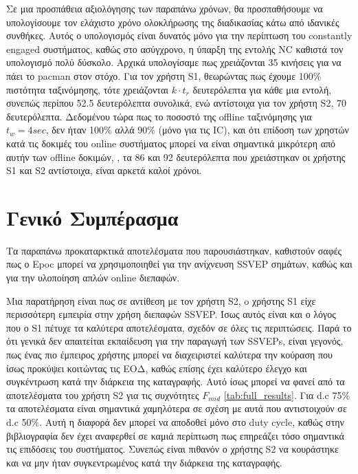 \documentclass[11pt,a4paper,english,greek,twoside]{../Thesis}
\begin{document}
\par Σε μια προσπάθεια αξιολόγησης των παραπάνω χρόνων, θα προσπαθήσουμε να υπολογίσουμε τον ελάχιστο χρόνο ολοκλήρωσης της διαδικασίας κάτω από ιδανικές συνθήκες. Αυτός ο υπολογισμός είναι δυνατός μόνο για την περίπτωση του constantly engaged συστήματος, καθώς στο ασύγχρονο, η ύπαρξη της εντολής NC καθιστά τον υπολογισμό πολύ δύσκολο. Αρχικά υπολογίσαμε πως χρειάζονται 35 κινήσεις για να πάει το pacman στον στόχο. Για τον χρήστη S1, θεωρώντας πως έχουμε 100\% πιστότητα ταξινόμησης, τότε χρειάζονται $k\cdot t_r$ δευτερόλεπτα για κάθε μια εντολή, συνεπώς περίπου 52.5 δευτερόλεπτα συνολικά, ενώ αντίστοιχα για τον χρήστη S2, 70 δευτερόλεπτα. Δεδομένου τώρα πως το ποσοστό της offline ταξινόμησης για $t_w=4sec$, δεν ήταν 100\% αλλά 90\% (μόνο για τις IC), και ότι επίδοση των χρηστών κατά τις δοκιμές του online συστήματος μπορεί να είναι σημαντικά μικρότερη από αυτήν των offline δοκιμών, \cite{Muller-Putz2006-wj} \cite{Yuan2013-jp}, τα 86 και 92 δευτερόλεπτα που χρειάστηκαν οι χρήστης S1 και S2 αντίστοιχα, είναι αρκετά καλοί χρόνοι. 

\section{Γενικό Συμπέρασμα}

\par Τα παραπάνω προκαταρκτικά αποτελέσματα που παρουσιάστηκαν, καθιστούν σαφές πως ο Epoc μπορεί να χρησιμοποιηθεί για την ανίχνευση SSVEP σημάτων, καθώς και για την υλοποίηση απλών online διεπαφών.
\par Μια παρατήρηση είναι πως σε αντίθεση με τον χρήστη S2, o χρήστης S1 είχε περισσότερη εμπειρία στην χρήση διεπαφών SSVEP. Ίσως αυτός είναι και ο λόγος που ο S1 πέτυχε τα καλύτερα αποτελέσματα, σχεδόν σε όλες τις περιπτώσεις. Παρά το ότι γενικά δεν απαιτείται εκπαίδευση για την παραγωγή των SSVEPs, είναι γεγονός, πως ένας πιο έμπειρος χρήστης μπορεί να διαχειριστεί καλύτερα την κούραση που ίσως προκύψει κοιτώντας τις ΕΟΔ, καθώς επίσης έχει καλύτερο έλεγχο και συγκέντρωση κατά την διάρκεια της καταγραφής. Αυτό ίσως μπορεί να φανεί από τα αποτελέσματα του χρήστη S2 για τις συχνότητες $F_{mid}$ \ref{tab:full_results}. Για d.c 75\% τα αποτελέσματα είναι σημαντικά χαμηλότερα σε σχέση με αυτά που αντιστοιχούν σε d.c 50\%. Αυτή η διαφορά δεν μπορεί να αποδοθεί μόνο στο duty cycle, καθώς στην βιβλιογραφία δεν έχει αναφερθεί σε καμιά περίπτωση πως επηρεάζει τόσο σημαντικά τις επιδόσεις του συστήματος. Συνεπώς είναι πιθανόν ο χρήστης S2 να κουράστηκε και να μην ήταν συγκεντρωμένος κατά την διάρκεια της καταγραφής.
\end{document}

